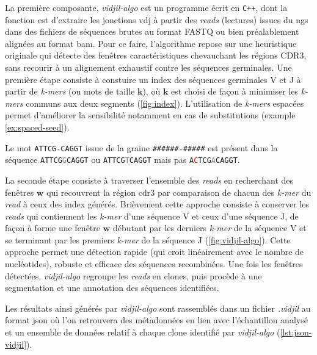 La première composante, \textit{vidjil-algo} est un programme écrit en \texttt{C++}, dont la fonction est d'extraire 
les jonctions \gls{vdj} à partir des \textit{reads} (lectures) issues du \gls{ngs} dans des fichiers de séquences 
brutes au format FASTQ ou bien préalablement alignées au format \gls{bam}. Pour ce faire, l'algorithme 
repose sur une heuristique originale qui détecte des fenêtres caractéristiques chevauchant les régions CDR3, 
sans recourir à un alignement exhaustif contre les séquences germinales. Une première étape consiste à constuire un index 
des séquences germinales V et J à partir de \textit{k-mers} (ou mots de taille $\mathbf{k}$), où $\mathbf{k}$ est choisi de façon à 
minimiser les \textit{k-mers} communs aux deux segments (\autoref{fig:index}). L'utilisation de \textit{k-mers} espacées permet d'améliorer la sensibilité 
notamment en cas de substitutions (example \ref{ex:spaced-seed}).

\begin{examplebox}[label={ex:spaced-seed}]
    Le mot \texttt{ATTCG-CAGGT} issue de la graine \texttt{\#\#\#\#\#\#-\#\#\#\#\#} 
    est présent dans la séquence \texttt{ATTCG\textcolor{gray}{G}CAGGT} ou \texttt{ATTCG\textcolor{gray}{T}CAGGT} 
    mais pas \texttt{A\textcolor{red}{C}TCG\textcolor{gray}{A}CAGGT}.
\end{examplebox}


    
La seconde étape consiste à traverser l'ensemble des \textit{reads} en recherchant des fenêtres $\mathbf{w}$ qui recouvrent 
la région \gls{cdr}3 par comparaison de chacun des \textit{k-mer} du \textit{read} à ceux des index générés. Brièvement cette 
approche consiste à conserver les \textit{reads} qui contiennent les \textit{k-mer} d'une séquence V et ceux d'une séquence J, 
de façon à forme une fenêtre $\mathbf{w}$ débutant par les derniers \textit{k-mer} de la séquence V et se terminant 
par les premiers \textit{k-mer} de la séquence J (\autoref{fig:vidjil-algo}).
Cette approche permet une détection rapide (qui croit linéairement avec le nombre de nucléotides), robuste et efficace 
des séquences recombinées. Une fois les fenêtres détectées, \textit{vidjil-algo} regroupe les \textit{reads} en clones, 
puis procède à une segmentation et une annotation des séquences identifiées.



Les résultats ainsi générés par \textit{vidjil-algo} sont rassemblés dans un fichier \textit{.vidjil} au format \gls{json} où 
l'on retrouvera des métadonnées en lien avec l'échantillon analysé et un ensemble de données relatif à chaque clone 
identifié par \textit{vidjil-algo} (\autoref{lst:json-vidjil}).

